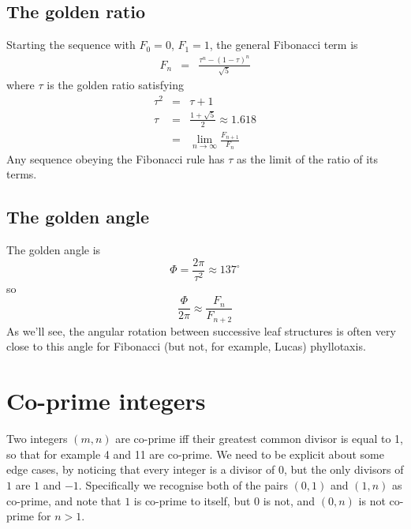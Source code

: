\subsection{The golden ratio}
Starting the sequence with $F_0=0$, $F_1=1$, the general Fibonacci term is 
\begin{eqnarray}
F_n &=& \frac{\tau^n - (1-\tau)^n}{\sqrt{5}}
\end{eqnarray}
where $\tau$ is the golden ratio 
satisfying
\begin{eqnarray}
\tau^2 &=& \tau+1
\\
\tau &=& \frac{1+\sqrt{5}}{2} \approx 1.618
\\
&=& \lim_{n\rightarrow\infty} \frac{F_{n+1}}{F_n} 
\end{eqnarray}
Any sequence obeying the Fibonacci rule has $\tau$  as the limit of the ratio of its terms.

\subsection{The golden angle}
The golden angle is
\[
\Phi = \frac{2\pi}{\tau^2}  \approx 137^\circ
\]
so
\[
\frac{\Phi}{2 \pi} \approx \frac{F_{n}}{F_{n+2}}
\]
As we'll see, the angular rotation between successive leaf structures is often very close to this angle for Fibonacci (but not, for example, Lucas) phyllotaxis.




\section{Co-prime integers}

\label{sec:coprime}
Two integers $(m,n)$ are co-prime iff their greatest common divisor is equal to 1, so that for example 4 and 11 are co-prime. We need to be explicit about some edge cases, by noticing that every integer is a divisor of $0$, but the only divisors of $1$ are $1$ and $-1$. Specifically we recognise both of the pairs $(0,1)$ and $(1,n)$ as co-prime, and note that $1$ is co-prime to itself, but $0$ is not, and $(0,n)$ is not co-prime for $n>1$.%

